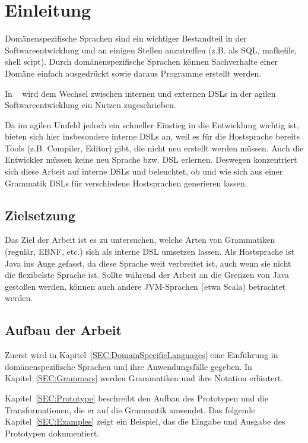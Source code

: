 \documentclass[../InterneDSLs.tex]{subfiles}
\begin{document}
\chapter{Einleitung}
Domänenspezifische Sprachen sind ein wichtiger Bestandteil in der Softwareentwicklung und an einigen Stellen anzutreffen (z.B. als SQL, mafkefile, shell scipt). Durch domänenspezifische Sprachen können Sachverhalte einer Domäne einfach ausgedrückt sowie daraus Programme erstellt werden. 

In ~\cite{butting2018deriving} wird dem Wechsel zwischen internen und externen DSLs in der agilen Softwareentwicklung ein Nutzen zugeschrieben.

Da im agilen Umfeld jedoch ein schneller Einstieg in die Entwicklung wichtig ist, bieten sich hier insbesondere interne \acsp{DSL} an, weil es für die Hostsprache bereits Tools (z.B. Compiler, Editor) gibt, die nicht neu erstellt werden müssen. Auch die Entwickler müssen keine neu Sprache bzw. DSL erlernen. Deswegen konzentriert sich diese Arbeit auf interne DSLs und beleuchtet, ob und wie sich aus einer Grammatik DSLs für verschiedene Hostsprachen generieren lassen.


\section{Zielsetzung}
Das Ziel der Arbeit ist es zu untersuchen, welche Arten von Grammatiken (regulär, \ac{EBNF}, etc.) sich als interne DSL umsetzen lassen. Als Hostsprache ist Java ins Auge gefasst, da diese Sprache weit verbreitet ist, auch wenn sie nicht die flexibelste Sprache ist. Sollte während der Arbeit an die Grenzen von Java gestoßen werden, können auch andere \ac{JVM}-Sprachen (etwa Scala) betrachtet werden.


\section{Aufbau der Arbeit}
Zuerst wird in Kapitel~\ref{SEC:DomainSpecificLanguages} eine Einführung in domänenspezifische Sprachen und ihre Anwendungsfälle gegeben. In Kapitel~\ref{SEC:Grammars} werden Grammatiken und ihre Notation erläutert.

Kapitel~\ref{SEC:Prototype} beschreibt den Aufbau des Prototypen und die Transformationen, die er auf die Grammatik anwendet. Das folgende Kapitel~\ref{SEC:Examples} zeigt ein Beispiel, das die Eingabe und Ausgabe des Prototypen dokumentiert.
\end{document}
